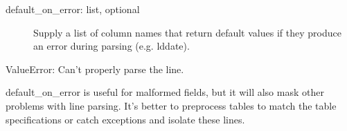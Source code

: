 \documentclass[letterpaper,10pt,english]{sphinxmanual}
\begin{document}
\begin{fulllineitems}
\begin{fulllineitems}
\begin{description}
\item[{default\_on\_error: list, optional}] \leavevmode
Supply a list of column names that return default values if they
produce an error during parsing (e.g. lddate).

\end{description}

ValueError:  Can’t properly parse the line.

default\_on\_error is useful for malformed fields, but it will also mask
other problems with line parsing. It’s better to pre\sphinxhyphen{}process tables 
to match the table specifications or catch exceptions and isolate 
these lines.

\begin{sphinxVerbatim}[commandchars=\\\{\}]
   
   
\end{sphinxVerbatim}

\end{fulllineitems}


\begin{fulllineitems}
\label{\detokenize{infrapy.database:infrapy.database.schema.fk_params.maxslowness}}
\end{fulllineitems}



\end{fulllineitems}
\end{document}
